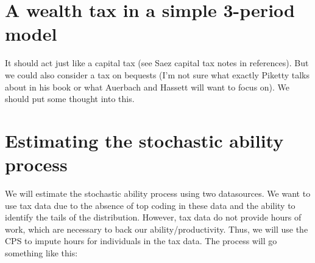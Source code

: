\documentclass[article,11pt,letterpaper,fleqn]{article}
\theoremstyle{definition}
\numberwithin{equation}{section}
\begin{document}
\section{A wealth tax in a simple 3-period model}

It should act just like a capital tax (see Saez capital tax notes in references).  But we could also consider a tax on bequests (I'm not sure what exactly Piketty talks about in his book or what Auerbach and Hassett will want to focus on).  We should put some thought into this.

\section{Estimating the stochastic ability process}

We will estimate the stochastic ability process using two datasources.  We want to use tax data due to the absence of top coding in these data and the ability to identify the tails of the distribution.  However, tax data do not provide hours of work, which are necessary to back our ability/productivity.  Thus, we will use the CPS to impute hours for individuals in the tax data.  The process will go something like this:
\end{document}
